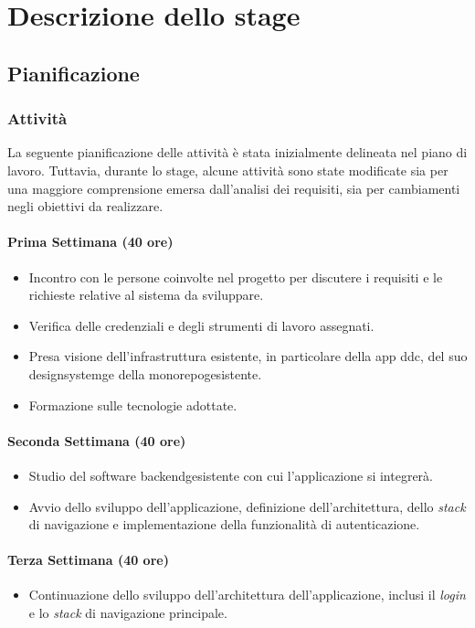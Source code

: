 \chapter{Descrizione dello stage}
\label{chap:stage_descrizione}

\section{Pianificazione}
\subsection{Attività}
La seguente pianificazione delle attività è stata inizialmente delineata nel piano di lavoro. 
Tuttavia, durante lo stage, alcune attività sono state modificate sia per una maggiore comprensione emersa dall'analisi dei requisiti, sia per cambiamenti negli obiettivi da realizzare.
\subsubsection*{Prima Settimana (40 ore)}
\begin{itemize}
    \item Incontro con le persone coinvolte nel progetto per discutere i requisiti e le richieste relative al sistema da sviluppare.
    \item Verifica delle credenziali e degli strumenti di lavoro assegnati.
    \item Presa visione dell'infrastruttura esistente, in particolare della app \gls{ddc}\glox, del suo \gls{designsystemg}\glox e della \gls{monorepog}\glox esistente.
    \item Formazione sulle tecnologie adottate.
\end{itemize}

\subsubsection*{Seconda Settimana (40 ore)}
\begin{itemize}
    \item Studio del software \gls{backendg}\glox esistente con cui l'applicazione si integrerà.
    \item Avvio dello sviluppo dell'applicazione, definizione dell'architettura, dello \textit{stack} di navigazione e implementazione della funzionalità di autenticazione.
\end{itemize}

\subsubsection*{Terza Settimana (40 ore)}
\begin{itemize}
    \item Continuazione dello sviluppo dell'architettura dell'applicazione, inclusi il \textit{login} e lo \textit{stack} di navigazione principale.
\end{itemize}

